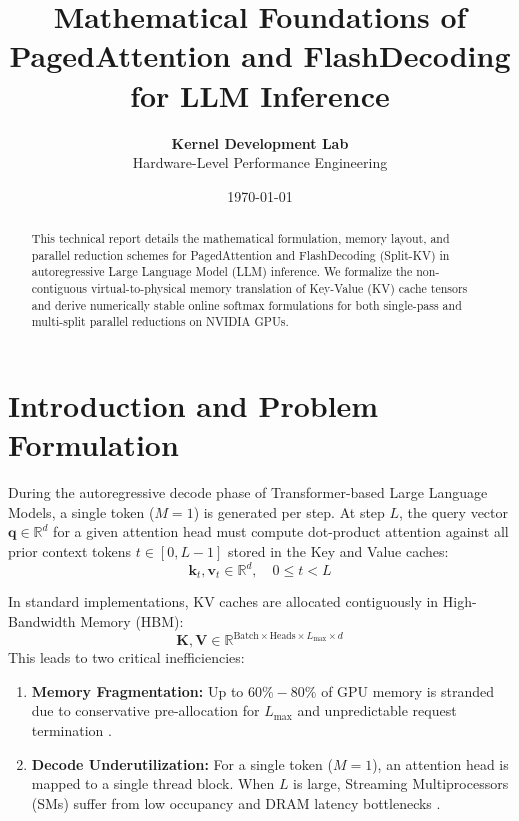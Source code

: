 \documentclass[11pt,a4paper]{article}
\title{\textbf{Mathematical Foundations of PagedAttention and FlashDecoding for LLM Inference}}
\author{\textbf{Kernel Development Lab} \\ Hardware-Level Performance Engineering}
\date{\today}
\begin{document}
\maketitle

\begin{abstract}
This technical report details the mathematical formulation, memory layout, and parallel reduction schemes for PagedAttention \cite{kwon2023pagedattention} and FlashDecoding (Split-KV) \cite{dao2023flashdecoding} in autoregressive Large Language Model (LLM) inference. We formalize the non-contiguous virtual-to-physical memory translation of Key-Value (KV) cache tensors and derive numerically stable online softmax formulations \cite{milakov2018online, dao2022flashattention} for both single-pass and multi-split parallel reductions on NVIDIA GPUs.
\end{abstract}

\section{Introduction and Problem Formulation}

During the autoregressive decode phase of Transformer-based Large Language Models, a single token ($M=1$) is generated per step. At step $L$, the query vector $\mathbf{q} \in \mathbb{R}^{d}$ for a given attention head must compute dot-product attention against all prior context tokens $t \in [0, L-1]$ stored in the Key and Value caches:
\begin{equation}
\mathbf{k}_t, \mathbf{v}_t \in \mathbb{R}^{d}, \quad 0 \le t < L
\end{equation}

In standard implementations, KV caches are allocated contiguously in High-Bandwidth Memory (HBM):
\begin{equation}
\mathbf{K}, \mathbf{V} \in \mathbb{R}^{\text{Batch} \times \text{Heads} \times L_{\max} \times d}
\end{equation}
This leads to two critical inefficiencies:
\begin{enumerate}
    \item \textbf{Memory Fragmentation:} Up to $60\% - 80\%$ of GPU memory is stranded due to conservative pre-allocation for $L_{\max}$ and unpredictable request termination \cite{kwon2023pagedattention}.
    \item \textbf{Decode Underutilization:} For a single token ($M=1$), an attention head is mapped to a single thread block. When $L$ is large, Streaming Multiprocessors (SMs) suffer from low occupancy and DRAM latency bottlenecks \cite{dao2023flashdecoding}.
\end{enumerate}
\end{document}
